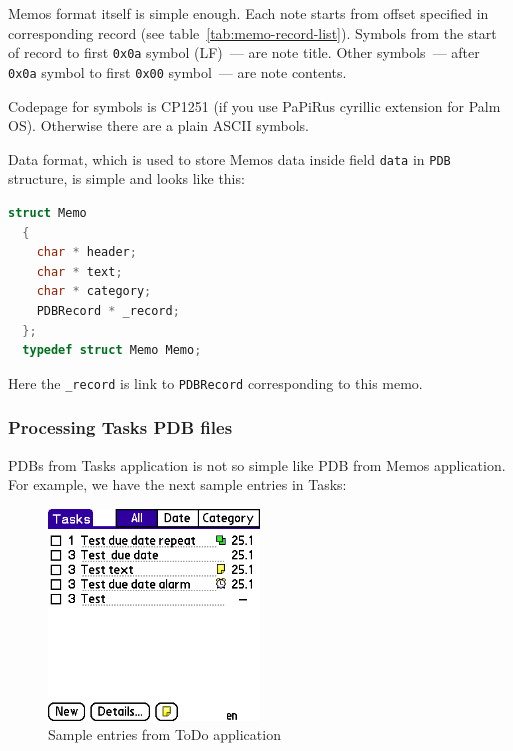 \documentclass[a4paper,12pt,oneside]{scrartcl}
\begin{document}
Memos format itself is simple enough. Each note starts from offset specified in
corresponding record (see table~\ref{tab:memo-record-list}). Symbols from the
start of record to first \texttt{0x0a} symbol (LF)~--- are note title. Other
symbols~--- after \texttt{0x0a} symbol to first \texttt{0x00} symbol~--- are
note contents.

Codepage for symbols is CP1251 (if you use PaPiRus cyrillic extension for Palm
OS). Otherwise there are a plain ASCII symbols.

Data format, which is used to store Memos data inside field \texttt{data} in
\texttt{PDB} structure, is simple and looks like this:
\begin{lstlisting}[language=C, caption={C structure to store memo data}]
  struct Memo
  {
	char * header;
	char * text;
    char * category;
    PDBRecord * _record;
  };
  typedef struct Memo Memo;
\end{lstlisting}

Here the \texttt{\_record} is link to \texttt{PDBRecord} corresponding to this
memo.

\subsubsection{Processing Tasks PDB files}
\label{sec:processing-todo-pdb}

PDBs from Tasks application is not so simple like PDB from Memos
application. For example, we have the next sample entries in Tasks:

\begin{figure}[H]
  \centering
  \includegraphics[width=0.5\textwidth]{tasks.png}
  \caption{Sample entries from ToDo application}
  \label{fig:sample-todos}
\end{figure}
\end{document}
